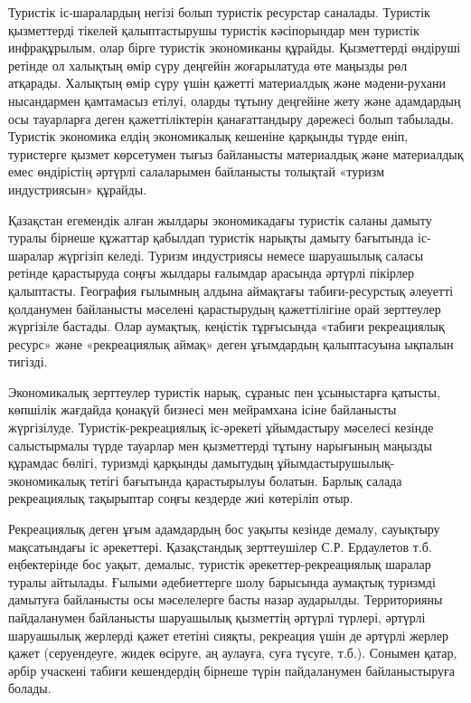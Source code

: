 \begin{multicols}{2}
Туристік іс-шаралардың негізі болып туристік ресурстар саналады.
Туристік қызметтерді тікелей қалыптастырушы туристік кәсіпорындар мен
туристік инфрақұрылым, олар бірге туристік экономиканы құрайды.
Қызметтерді өндіруші ретінде ол халықтың өмір сүру деңгейін жоғарылатуда
өте маңызды рөл атқарады. Халықтың өмір сүру үшін қажетті материалдық
және мәдени-рухани нысандармен қамтамасыз етілуі, оларды тұтыну
деңгейіне жету және адамдардың осы тауарларға деген қажеттіліктерін
қанағаттандыру дәрежесі болып табылады. Туристік экономика елдің
экономикалық кешеніне қарқынды түрде еніп, туристерге қызмет көрсетумен
тығыз байланысты материалдық және материалдық емес өндірістің әртүрлі
салаларымен байланысты толықтай «туризм индустриясын» құрайды.

Қазақстан егемендік алған жылдары экономикадағы туристік саланы дамыту
туралы бірнеше құжаттар қабылдап туристік нарықты дамыту бағытында
іс-шаралар жүргізіп келеді. Туризм индустриясы немесе шаруашылық саласы
ретінде қарастыруда соңғы жылдары ғалымдар арасында әртүрлі пікірлер
қалыптасты. География ғылымның алдына аймақтағы табиғи-ресурстық
әлеуетті қолданумен байланысты мәселені қарастырудың қажеттілігіне орай
зерттеулер жүргізіле бастады. Олар аумақтық, кеңістік тұрғысында «табиғи
рекреациялық ресурс» және «рекреациялық аймақ» деген ұғымдардың
қалыптасуына ықпалын тигізді.

Экономикалық зерттеулер туристік нарық, сұраныс пен ұсыныстарға қатысты,
көпшілік жағдайда қонақүй бизнесі мен мейрамхана ісіне байланысты
жүргізілуде. Туристік-рекреациялық іс-әрекеті ұйымдастыру мәселесі
кезінде салыстырмалы түрде тауарлар мен қызметтерді тұтыну нарығының
маңызды құрамдас бөлігі, туризмді қарқынды дамытудың
ұйымдастырушылық-экономикалық тетігі бағытында қарастырылуы болатын.
Барлық салада рекреациялық тақырыптар соңғы кездерде жиі көтеріліп отыр.

Рекреациялық деген ұғым адамдардың бос уақыты кезінде демалу, сауықтыру
мақсатындағы іс әрекеттері. Қазақстандық зерттеушілер С.Р. Ердаулетов
т.б. еңбектерінде бос уақыт, демалыс, туристік әрекеттер-рекреациялық
шаралар туралы айтылады. Ғылыми әдебиеттерге шолу барысында аумақтық
туризмді дамытуға байланысты осы мәселелерге басты назар аударылды.
Территорияны пайдаланумен байланысты шаруашылық қызметтің әртүрлі
түрлері, әртүрлі шаруашылық жерлерді қажет ететіні сияқты, рекреация
үшін де әртүрлі жерлер қажет (серуендеуге, жидек өсіруге, аң аулауға,
суға түсуге, т.б.). Сонымен қатар, әрбір учаскені табиғи кешендердің
бірнеше түрін пайдаланумен байланыстыруға болады.


\end{multicols}
